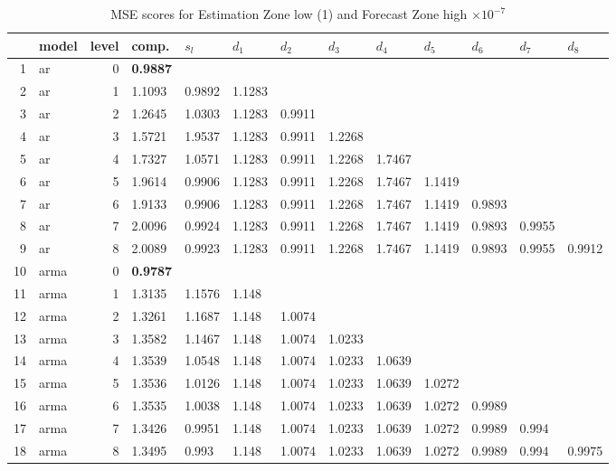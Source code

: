 \documentclass[10pt,a4paper]{article}
\begin{document}
\begin{table}[ht]
\centering
\caption{MSE scores for Estimation Zone low (1) and Forecast Zone high $ \times 10^{-7}$} 
\begin{tabular}{rlrllllllllll}
  \hline
 & model & level & comp. & $s_l$ & $d_1$ & $d_2$ & $d_3$ & $d_4$ & $d_5$ & $d_6$ & $d_7$ & $d_8$ \\ 
  \hline
1 & ar &     0 & \textbf{0.9887} &  &  &  &  &  &  &  &  &  \\ 
  2 & ar &     1 & 1.1093 & 0.9892 & 1.1283 &  &  &  &  &  &  &  \\ 
  3 & ar &     2 & 1.2645 & 1.0303 & 1.1283 & 0.9911 &  &  &  &  &  &  \\ 
  4 & ar &     3 & 1.5721 & 1.9537 & 1.1283 & 0.9911 & 1.2268 &  &  &  &  &  \\ 
  5 & ar &     4 & 1.7327 & 1.0571 & 1.1283 & 0.9911 & 1.2268 & 1.7467 &  &  &  &  \\ 
  6 & ar &     5 & 1.9614 & 0.9906 & 1.1283 & 0.9911 & 1.2268 & 1.7467 & 1.1419 &  &  &  \\ 
  7 & ar &     6 & 1.9133 & 0.9906 & 1.1283 & 0.9911 & 1.2268 & 1.7467 & 1.1419 & 0.9893 &  &  \\ 
  8 & ar &     7 & 2.0096 & 0.9924 & 1.1283 & 0.9911 & 1.2268 & 1.7467 & 1.1419 & 0.9893 & 0.9955 &  \\ 
  9 & ar &     8 & 2.0089 & 0.9923 & 1.1283 & 0.9911 & 1.2268 & 1.7467 & 1.1419 & 0.9893 & 0.9955 & 0.9912 \\ 
   \hline
10 & arma &     0 & \textbf{0.9787} &  &  &  &  &  &  &  &  &  \\ 
  11 & arma &     1 & 1.3135 & 1.1576 & 1.148 &  &  &  &  &  &  &  \\ 
  12 & arma &     2 & 1.3261 & 1.1687 & 1.148 & 1.0074 &  &  &  &  &  &  \\ 
  13 & arma &     3 & 1.3582 & 1.1467 & 1.148 & 1.0074 & 1.0233 &  &  &  &  &  \\ 
  14 & arma &     4 & 1.3539 & 1.0548 & 1.148 & 1.0074 & 1.0233 & 1.0639 &  &  &  &  \\ 
  15 & arma &     5 & 1.3536 & 1.0126 & 1.148 & 1.0074 & 1.0233 & 1.0639 & 1.0272 &  &  &  \\ 
  16 & arma &     6 & 1.3535 & 1.0038 & 1.148 & 1.0074 & 1.0233 & 1.0639 & 1.0272 & 0.9989 &  &  \\ 
  17 & arma &     7 & 1.3426 & 0.9951 & 1.148 & 1.0074 & 1.0233 & 1.0639 & 1.0272 & 0.9989 & 0.994 &  \\ 
  18 & arma &     8 & 1.3495 & 0.993 & 1.148 & 1.0074 & 1.0233 & 1.0639 & 1.0272 & 0.9989 & 0.994 & 0.9975 \\ 

\end{tabular}
\end{table}
\end{document}
